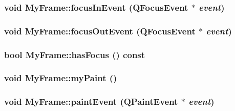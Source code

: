 \hypertarget{class_my_frame_ee2d52f24c497e8183b08b199690a2ec}{
\subsubsection[{focusInEvent}]{\setlength{\rightskip}{0pt plus 5cm}void MyFrame::focusInEvent (QFocusEvent $\ast$ {\em event})}}
\label{class_my_frame_ee2d52f24c497e8183b08b199690a2ec}


\hypertarget{class_my_frame_64a3e5779e8a62f963de11ce75e5480f}{
\subsubsection[{focusOutEvent}]{\setlength{\rightskip}{0pt plus 5cm}void MyFrame::focusOutEvent (QFocusEvent $\ast$ {\em event})}}
\label{class_my_frame_64a3e5779e8a62f963de11ce75e5480f}


\hypertarget{class_my_frame_57b97439f113ac89c53e6e036238e686}{
\subsubsection[{hasFocus}]{\setlength{\rightskip}{0pt plus 5cm}bool MyFrame::hasFocus () const}}
\label{class_my_frame_57b97439f113ac89c53e6e036238e686}


\hypertarget{class_my_frame_45169ce8a61142d2231da2b5551c63f1}{
\subsubsection[{myPaint}]{\setlength{\rightskip}{0pt plus 5cm}void MyFrame::myPaint ()}}
\label{class_my_frame_45169ce8a61142d2231da2b5551c63f1}


\hypertarget{class_my_frame_bce78e90918adc3c95cc39b28ff8c2f6}{
\subsubsection[{paintEvent}]{\setlength{\rightskip}{0pt plus 5cm}void MyFrame::paintEvent (QPaintEvent $\ast$ {\em event})}}
\label{class_my_frame_bce78e90918adc3c95cc39b28ff8c2f6}


